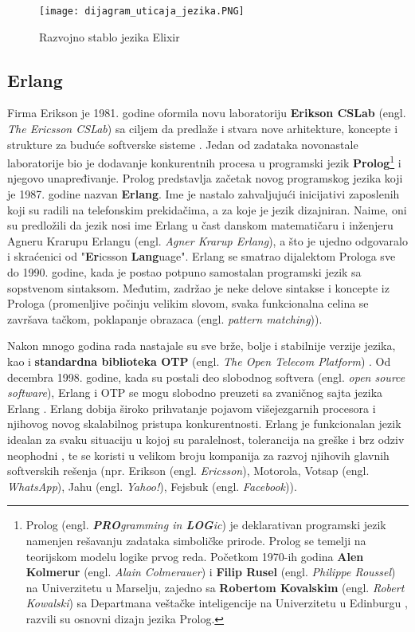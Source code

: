 \documentclass[12pt,oneside]{memoir}
\begin{document}
\begin{figure}[!ht]
  \centering
  \texttt{[image: dijagram\_uticaja\_jezika.PNG]}
  \caption{Razvojno stablo jezika Elixir}
  \label{fig:razvojnoStablo}
\end{figure}

\subsection{Erlang}
Firma Erikson je 1981. godine oformila novu laboratoriju \textbf{Erikson CSLab} (engl. \textit{The Ericsson CSLab}) sa ciljem da predlaže i stvara nove arhitekture, koncepte i strukture za buduće softverske sisteme \cite{ErlangBook2}. Jedan od zadataka novonastale laboratorije bio je dodavanje konkurentnih procesa u programski jezik \textbf{Prolog}\footnote{Prolog (engl. \textit{\textbf{PRO}gramming in \textbf{LOG}ic}) je deklarativan programski jezik namenjen rešavanju zadataka simboličke prirode. Prolog se temelji na teorijskom modelu logike prvog reda. Početkom 1970-ih godina \textbf{Alen Kolmerur} (engl. \textit{Alain Colmerauer}) i \textbf{Filip Rusel} (engl. \textit{Philippe Roussel}) na Univerzitetu u Marselju, zajedno sa \textbf{Robertom Kovalskim} (engl. \textit{Robert Kowalski}) sa Departmana veštačke inteligencije na Univerzitetu u Edinburgu , razvili su osnovni dizajn jezika Prolog.} i njegovo unapređivanje. Prolog predstavlja začetak novog programskog jezika koji je 1987. godine nazvan \textbf{Erlang}. Ime je nastalo zahvaljujući inicijativi zaposlenih koji su radili na telefonskim prekidačima, a za koje je jezik dizajniran. Naime, oni su predložili da jezik nosi ime Erlang u čast danskom matematičaru i inženjeru Agneru Krarupu Erlangu (engl. \textit{Agner Krarup Erlang}), a što je ujedno odgovaralo i skraćenici od  "\textbf{Er}icsson \textbf{Lang}uage". Erlang se smatrao dijalektom Prologa sve do 1990. godine, kada je postao potpuno samostalan programski jezik sa sopstvenom sintaksom. Međutim, zadržao je neke delove sintakse i koncepte iz Prologa (promenljive počinju velikim slovom, svaka funkcionalna celina se završava tačkom, poklapanje obrazaca (engl. \textit{pattern matching})).

Nakon mnogo godina rada nastajale su sve brže, bolje i stabilnije verzije jezika, kao i \textbf{standardna biblioteka OTP} (engl. \textit{The Open Telecom Platform}) \cite{OTP}. Od decembra 1998. godine, kada su postali deo slobodnog softvera (engl. \textit{open source software}), Erlang i OTP se mogu slobodno preuzeti sa zvaničnog sajta jezika Erlang \cite{OTP}. Erlang dobija široko prihvatanje pojavom višejezgarnih procesora i njihovog novog skalabilnog pristupa konkurentnosti. Erlang je funkcionalan jezik idealan za svaku situaciju u kojoj su paralelnost, tolerancija na greške i brz odziv neophodni \cite{ErlangBook}, te se koristi u velikom broju kompanija za razvoj njihovih glavnih softverskih rešenja (npr. Erikson (engl. \textit{Ericsson}), Motorola, Votsap (engl. \textit{WhatsApp}), Jahu (engl. \textit{Yahoo!}),
Fejsbuk (engl. \textit{Facebook})).
\end{document}

